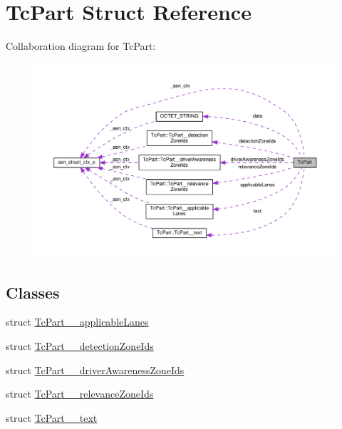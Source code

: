 \hypertarget{structTcPart}{}\section{Tc\+Part Struct Reference}
\label{structTcPart}


Collaboration diagram for Tc\+Part\+:\nopagebreak
\begin{figure}[H]
\begin{center}
\leavevmode
\includegraphics[width=350pt]{structTcPart__coll__graph}
\end{center}
\end{figure}
\subsection*{Classes}
\begin{DoxyCompactItemize}
\item 
struct \hyperlink{structTcPart_1_1TcPart____applicableLanes}{Tc\+Part\+\_\+\+\_\+applicable\+Lanes}
\item 
struct \hyperlink{structTcPart_1_1TcPart____detectionZoneIds}{Tc\+Part\+\_\+\+\_\+detection\+Zone\+Ids}
\item 
struct \hyperlink{structTcPart_1_1TcPart____driverAwarenessZoneIds}{Tc\+Part\+\_\+\+\_\+driver\+Awareness\+Zone\+Ids}
\item 
struct \hyperlink{structTcPart_1_1TcPart____relevanceZoneIds}{Tc\+Part\+\_\+\+\_\+relevance\+Zone\+Ids}
\item 
struct \hyperlink{structTcPart_1_1TcPart____text}{Tc\+Part\+\_\+\+\_\+text}
\end{DoxyCompactItemize}
